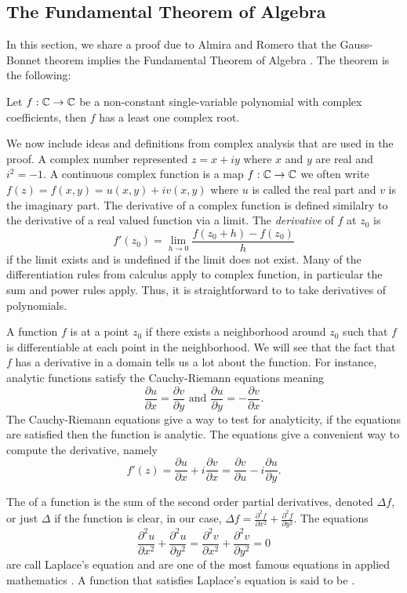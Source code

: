 \subsection{The Fundamental Theorem of Algebra}
\label{sec:fta}

In this section, we share a proof due to Almira and Romero that
the Gauss-Bonnet theorem implies the
Fundamental Theorem of Algebra \cite{almira_yet_2007}.
The theorem is the following:
\begin{theorem}\label{thm:fta}
	Let $f:\mathbb{C} \to \mathbb{C}$ be a non-constant single-variable polynomial with complex coefficients,
	then $f$ has a least one complex root.
\end{theorem}


We now include ideas and definitions from complex analysis that are used
in the proof. 
A complex number represented $z=x+iy$ where $x$ and $y$ are real
and $i^2=-1.$
A continuous complex function is a map $f:\mathbb{C}\to \mathbb{C}$ we often write
 $f(z)=f(x,y)=u(x,y)+iv(x,y)$ where $u$ is called the real part and $v$ is the imaginary part.
The derivative of a complex function is defined similalry to the derivative of a real valued
function via a limit. The \emph{derivative} of $f$ at $z_0$ is
$$f'(z_0)=\lim_{h\to 0} \frac{f(z_0+h)-f(z_0)}{h}$$
if the limit exists and is undefined if the limit does not exist.
Many of the differentiation rules from calculus apply to complex function,
in particular the sum and power rules apply. Thus, it is straightforward to 
to take derivatives of polynomials.


A function $f$ is  at a point $z_0$ if there exists a neighborhood around $z_0$ 
such that $f$ is differentiable at each point in the neighborhood.
We will see that the fact that $f$ has a derivative in a domain tells
us a lot about the function. For instance, analytic functions satisfy the Cauchy-Riemann 
equations meaning
$$\frac{\partial u}{\partial x}=\frac{\partial v}{\partial y} \textrm{ and } \frac{\partial u}{\partial y}=- \frac{\partial v}{\partial x}.$$
The Cauchy-Riemann equations give a way to test for analyticity, if the equations
are satisfied then the function is analytic.
The equations give a convenient way to compute the derivative, namely
$$f'(z)=\frac{\partial u}{\partial x} +i \frac{\partial v}{\partial x} =\frac{\partial v}{\partial u} -i \frac{\partial u}{\partial y}.$$


The  of a function is the sum of the second order partial derivatives, denoted $\Delta f$,
or just $\Delta$ if the function is clear,
in our case, $\Delta f=\frac{\partial^2 f}{\partial x^2}+\frac{\partial^2 f}{\partial y^2}$.
The equations $$\frac{\partial^2 u}{\partial x^2}+\frac{\partial^2 u}{\partial y^2}=
\frac{\partial^2 v}{\partial x^2}+\frac{\partial^2 v}{\partial y^2}=0$$
are call Laplace's equation and are one of the most famous equations in applied mathematics
\cite{zill_first_2008}.
A function that satisfies Laplace's equation is said to be .

